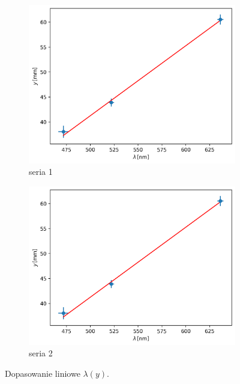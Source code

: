 \documentclass[12pt]{article}
\begin{document}
\begin{figure}[H]
  \centering
  \begin{subfigure}{0.45\textwidth}
    \includegraphics[width=\linewidth]{line_fit_distance_1}
    \caption{seria 1}
    \label{fig:line_fit_distance_1}
  \end{subfigure}\hfill
  \begin{subfigure}{0.45\textwidth}
    \includegraphics[width=\linewidth]{line_fit_distance_1}
    \caption{seria 2}
    \label{fig:line_fit_distance_2}
  \end{subfigure}
  \caption{Dopasowanie liniowe \(\lambda(y)\).}
  \label{fig:line_fit_distance}
\end{figure}
\end{document}
